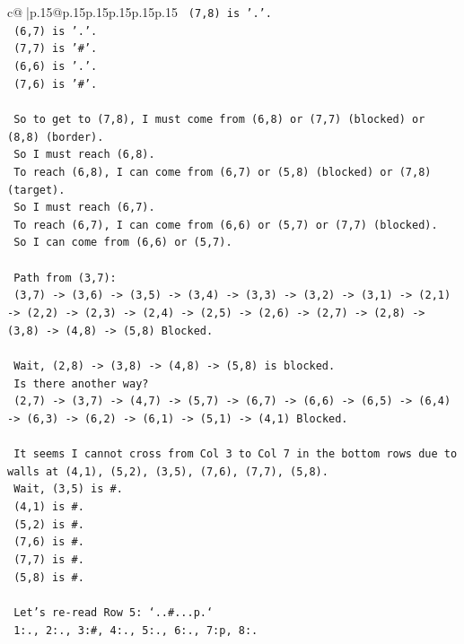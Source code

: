 \documentclass{article}
\begin{document}
{\begin{supertabular}{c@{$\;$}|p{.15\linewidth}@{}p{.15\linewidth}p{.15\linewidth}p{.15\linewidth}p{.15\linewidth}p{.15\linewidth}}
{{{\texttt{  (7,8) is '.'.} \\
\texttt{  (6,7) is '.'.} \\
\texttt{  (7,7) is '\#'.} \\
\texttt{  (6,6) is '.'.} \\
\texttt{  (7,6) is '\#'.} \\
\\ 
\texttt{  So to get to (7,8), I must come from (6,8) or (7,7) (blocked) or (8,8) (border).} \\
\texttt{  So I must reach (6,8).} \\
\texttt{  To reach (6,8), I can come from (6,7) or (5,8) (blocked) or (7,8) (target).} \\
\texttt{  So I must reach (6,7).} \\
\texttt{  To reach (6,7), I can come from (6,6) or (5,7) or (7,7) (blocked).} \\
\texttt{  So I can come from (6,6) or (5,7).} \\
\\ 
\texttt{  Path from (3,7):} \\
\texttt{  (3,7) {-}> (3,6) {-}> (3,5) {-}> (3,4) {-}> (3,3) {-}> (3,2) {-}> (3,1) {-}> (2,1) {-}> (2,2) {-}> (2,3) {-}> (2,4) {-}> (2,5) {-}> (2,6) {-}> (2,7) {-}> (2,8) {-}> (3,8) {-}> (4,8) {-}> (5,8) Blocked.} \\
\\ 
\texttt{  Wait, (2,8) {-}> (3,8) {-}> (4,8) {-}> (5,8) is blocked.} \\
\texttt{  Is there another way?} \\
\texttt{  (2,7) {-}> (3,7) {-}> (4,7) {-}> (5,7) {-}> (6,7) {-}> (6,6) {-}> (6,5) {-}> (6,4) {-}> (6,3) {-}> (6,2) {-}> (6,1) {-}> (5,1) {-}> (4,1) Blocked.} \\
\\ 
\texttt{  It seems I cannot cross from Col 3 to Col 7 in the bottom rows due to walls at (4,1), (5,2), (3,5), (7,6), (7,7), (5,8).} \\
\texttt{  Wait, (3,5) is \#.} \\
\texttt{  (4,1) is \#.} \\
\texttt{  (5,2) is \#.} \\
\texttt{  (7,6) is \#.} \\
\texttt{  (7,7) is \#.} \\
\texttt{  (5,8) is \#.} \\
\\ 
\texttt{  Let's re{-}read Row 5: `..\#...p.`} \\
\texttt{  1:., 2:., 3:\#, 4:., 5:., 6:., 7:p, 8:.} \\
}}}
\end{supertabular}}
\end{document}
